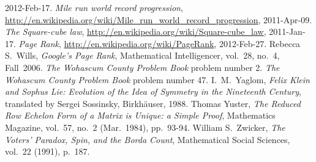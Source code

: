 \begin{thebibliography}{\makebox[2em][c]{{}\hfil{}}}
  2012-Feb-17.
  \emph{Mile run world record progression},
  \url{http://en.wikipedia.org/wiki/Mile_run_world_record_progression},
  2011-Apr-09.
  \emph{The Square-cube law},
  \url{http://en.wikipedia.org/wiki/Square-cube_law},
  2011-Jan-17.
  \emph{Page Rank},
  \url{http://en.wikipedia.org/wiki/PageRank},
  2012-Feb-27.
  Rebecca S.~Wills,
  \emph{Google's Page Rank},
  Mathematical Intelligencer,
  vol.~28, no.~4, Fall~2006.
  \emph{The Wohascum County Problem Book}
  problem number 2.
  \emph{The Wohascum County Problem Book}
  problem number 47.
  I.\ M.~Yaglom,
  \emph{Felix Klein and Sophus Lie: Evolution of the Idea of
   Symmetry in the Nineteenth Century},
  translated by Sergei Sossinsky,
  Birkh\"auser,
  1988.
  Thomas Yuster,
  \emph{The Reduced Row Echelon Form of a Matrix is Unique: a Simple Proof},
  Mathematics Magazine,
  vol.~57, no.~2 (Mar.~1984),
  pp.~93-94.
  William S.~Zwicker,
  \emph{The Voters' Paradox, Spin, and the Borda Count},
  Mathematical Social Sciences,
  vol.~22 (1991),
  p.~187. 
\end{thebibliography}
